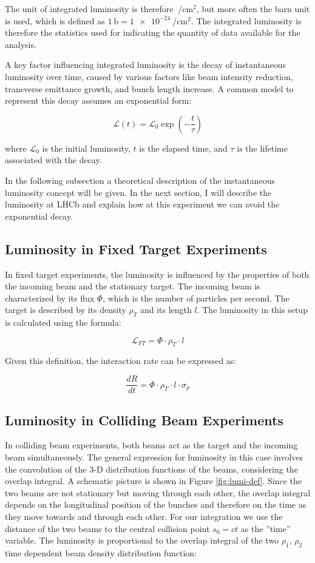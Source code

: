 The unit of integrated luminosity is therefore $\SI{}{\per\centi\meter\squared}$, but more often the barn unit is used, which is defined as $\SI{1}{\barn}=\SI{1e-24}{\per\centi\meter\squared}$. The integrated luminosity is therefore the statistics used for indicating the quantity of data available for the analysis.

A key factor influencing integrated luminosity is the decay of instantaneous luminosity over time, caused by various factors like beam intensity reduction, transverse emittance growth, and bunch length increase. A common model to represent this decay assumes an exponential form:

\begin{equation}
\mathcal{L}(t) = \mathcal{L}_0 \exp\left( -\frac{t}{\tau} \right)
\end{equation}

where $\mathcal{L}_0$ is the initial luminosity, \(t\) is the elapsed time, and \(\tau\) is the lifetime associated with the decay. 

In the following subsection a theoretical description of the instantaneous luminosity concept will be given.
In the next section, I will describe the luminosity at LHCb and explain how at this experiment we can avoid the exponential decay.

\subsection{Luminosity in Fixed Target Experiments}
In fixed target experiments, the luminosity is influenced by the properties of both the incoming beam and the stationary target. The incoming beam is characterized by its flux $\Phi$, which is the number of particles per second. The target is described by its density $\rho_T$ and its length $l$. The luminosity in this setup is calculated using the formula:

\[
\mathcal{L}_{FT} = \Phi \cdot \rho_T \cdot l
\]

Given this definition, the interaction rate can be expressed as:

\[
\frac{dR}{dt} = \Phi \cdot \rho_T \cdot l \cdot \sigma_p
\]

\subsection{Luminosity in Colliding Beam Experiments}
In colliding beam experiments, both beams act as the target and the incoming beam simultaneously. The general expression for luminosity in this case involves the convolution of the 3-D distribution functions of the beams, considering the overlap integral. A schematic picture is shown in Figure \ref{fig:lumi-def}\cite{Herr:941318}. Since the two beams are not stationary but moving through each other, the overlap integral depends on the longitudinal position of the bunches and therefore on the time as they move towards and through each other. For our integration we use the distance of the two beams to the central collision point $s_0 = ct$ as the ”time” variable. 
The luminosity is proportional to the overlap integral of the two  $\rho_1$, $\rho_2$ time dependent beam density distribution function:

